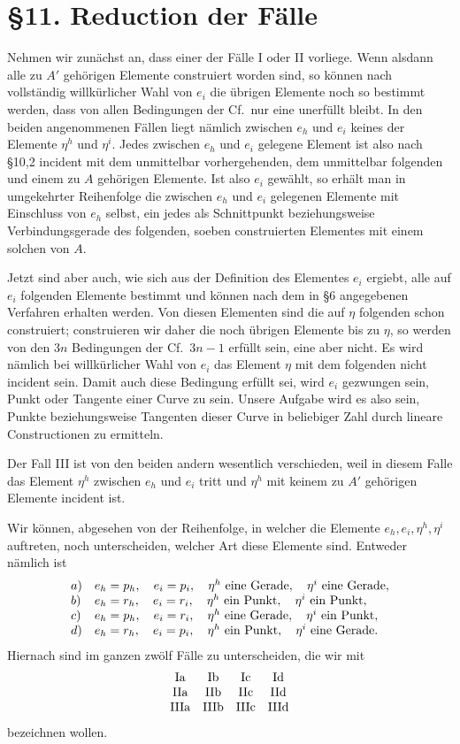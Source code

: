 \documentclass[11pt]{article}
\newcommand{\Cf}{\textup{Cf.}}
\begin{document}
\section*{\S 11. Reduction der Fälle}
Nehmen wir zunächst an, dass einer der Fälle I oder II vorliege. Wenn alsdann alle zu $A'$ gehörigen Elemente construiert worden sind, so können nach vollständig willkürlicher Wahl von $e_i$ die übrigen Elemente noch so bestimmt werden, dass von allen Bedingungen der \Cf\ nur eine unerfüllt bleibt. In den beiden angenommenen Fällen liegt nämlich zwischen $e_h$ und $e_i$ keines der Elemente $\eta^h$ und $\eta^i$. Jedes zwischen $e_h$ und $e_i$ gelegene Element ist also nach \S 10,2 incident mit dem unmittelbar vorhergehenden, dem unmittelbar folgenden und einem zu $A$ gehörigen Elemente. Ist also $e_i$ gewählt, so erhält man in umgekehrter Reihenfolge die zwischen $e_h$ und $e_i$ gelegenen Elemente mit Einschluss von $e_h$ selbst, ein jedes als Schnittpunkt beziehungsweise Verbindungsgerade des folgenden, soeben construierten Elementes mit einem solchen von $A$.

Jetzt sind aber auch, wie sich aus der Definition des Elementes $e_i$ ergiebt, alle auf $e_i$ folgenden Elemente bestimmt und können nach dem in \S 6 angegebenen Verfahren erhalten werden. Von diesen Elementen sind die auf $\eta$ folgenden schon construiert; construieren wir daher die noch übrigen Elemente bis zu $\eta$, so werden von den $3n$ Bedingungen der \Cf\ $3n-1$ erfüllt sein, eine aber nicht. Es wird nämlich bei willkürlicher Wahl von $e_i$ das Element $\eta$ mit dem folgenden nicht incident sein. Damit auch diese Bedingung erfüllt sei, wird $e_i$ gezwungen sein, Punkt oder Tangente einer Curve zu sein. Unsere Aufgabe wird es also sein, Punkte beziehungsweise Tangenten dieser Curve in beliebiger Zahl durch lineare Constructionen zu ermitteln.

Der Fall III ist von den beiden andern wesentlich verschieden, weil in diesem Falle das Element $\eta^h$ zwischen $e_h$ und $e_i$ tritt und $\eta^h$ mit keinem zu $A'$ gehörigen Elemente incident ist.

Wir können, abgesehen von der Reihenfolge, in welcher die Elemente $e_h,e_i,\eta^h,\eta^i$ auftreten, noch unterscheiden, welcher Art diese Elemente sind. Entweder nämlich ist
\[
\begin{array}{ll}
a)& e_h=p_h,
\quad e_i=p_i,
\quad \eta^h\hbox{ eine Gerade},
\quad \eta^i\hbox{ eine Gerade},\\
b)& e_h=r_h,
\quad e_i=r_i,
\quad \eta^h\hbox{ ein Punkt},
\quad \eta^i\hbox{ ein Punkt},\\
c)& e_h=p_h,
\quad e_i=r_i,
\quad \eta^h\hbox{ eine Gerade},
\quad \eta^i\hbox{ ein Punkt},\\
d)& e_h=r_h,
\quad e_i=p_i,
\quad \eta^h\hbox{ ein Punkt},
\quad \eta^i\hbox{ eine Gerade}.
\end{array}
\]
Hiernach sind im ganzen zwölf Fälle zu unterscheiden, die wir mit
\[
\begin{array}{cccc}
\mathrm{Ia}&\mathrm{Ib}&\mathrm{Ic}&\mathrm{Id}\cr
\mathrm{IIa}&\mathrm{IIb}&\mathrm{IIc}&\mathrm{IId}\cr
\mathrm{IIIa}&\mathrm{IIIb}&\mathrm{IIIc}&\mathrm{IIId}
\end{array}
\]
bezeichnen wollen.
\end{document}
